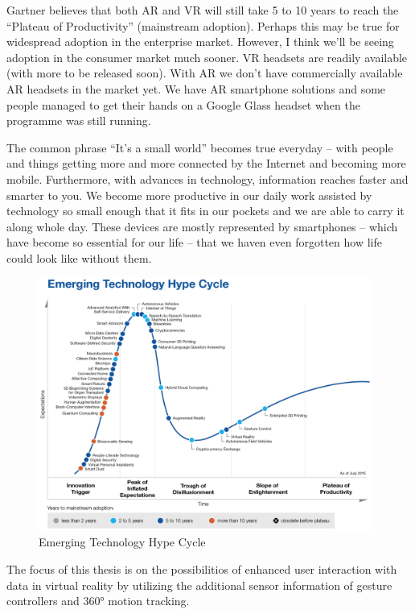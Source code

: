 Gartner believes that both AR and VR will still take 5 to 10 years to reach the “Plateau of Productivity” (mainstream adoption). Perhaps this may be true for widespread adoption in the enterprise market. However, I think we’ll be seeing adoption in the consumer market much sooner. VR headsets are readily available (with more to be released soon). With AR we don’t have commercially available AR headsets in the market yet. We have AR smartphone solutions and some people managed to get their hands on a Google Glass headset when the programme was still running.



The common phrase “It’s a small world” becomes true everyday – with people and things getting more and more connected by the Internet and becoming more mobile. Furthermore, with advances in technology, information reaches faster and smarter to you. We become more productive in our daily work assisted by technology so small enough that it fits in our pockets and we are able to carry it along whole day. These devices are mostly represented by smartphones – which have become so essential for our life – that we haven even forgotten how life could look like without them.





\begin{figure}[h]
	\begin{center}
		\includegraphics[width=11cm]{03_Figures/03_Gartner/Gartner_EmergingTech2015.png}
		\caption[Emerging Technology Hype Cycle]{Emerging Technology Hype Cycle \citep{Gartner2015b}}
		\label{fig:hypecycle}
	\end{center}
\end{figure}


The focus of this thesis is on the possibilitios of enhanced user interaction with data in virtual reality by utilizing the additional sensor information of gesture controllers and 360° motion tracking.

